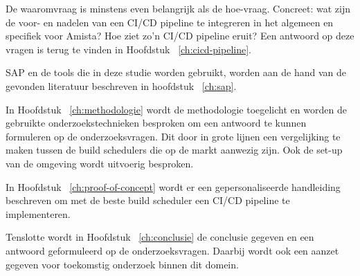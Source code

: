 De waaromvraag is minstens even belangrijk als de hoe-vraag. Concreet: wat zijn de voor- en nadelen van een CI/CD pipeline te integreren in het algemeen en specifiek voor Amista? Hoe ziet zo'n CI/CD pipeline eruit? Een antwoord op deze vragen is terug te vinden in Hoofdstuk ~\ref{ch:cicd-pipeline}.

SAP en de tools die in deze studie worden gebruikt, worden aan de hand van de gevonden literatuur beschreven in hoofdstuk ~\ref{ch:sap}.

In Hoofdstuk ~\ref{ch:methodologie} wordt de methodologie toegelicht en worden de gebruikte onderzoekstechnieken besproken om een antwoord te kunnen formuleren op de onderzoeksvragen. Dit door in grote lijnen een vergelijking te maken tussen de build schedulers die op de markt aanwezig zijn. Ook de set-up van de omgeving wordt uitvoerig besproken.

In Hoofdstuk ~\ref{ch:proof-of-concept} wordt er een gepersonaliseerde handleiding beschreven om met de beste build scheduler een CI/CD pipeline te implementeren.

Tenslotte wordt in Hoofdstuk ~\ref{ch:conclusie} de conclusie gegeven en een antwoord geformuleerd op de onderzoeksvragen. Daarbij wordt ook een aanzet gegeven voor toekomstig onderzoek binnen dit domein.